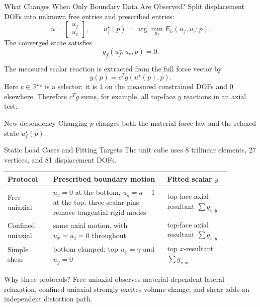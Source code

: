 \documentclass[aspectratio=169,10pt]{beamer}
\begin{document}
\begin{frame}{What Changes When Only Boundary Data Are Observed?}
  \small
  Split displacement DOFs into unknown free entries and prescribed entries:
  \[
    u=\begin{bmatrix}u_f\\u_c\end{bmatrix},
    \qquad
    u_f^\star(p)=\arg\min_{u_f}E_h(u_f,u_c;p).
  \]
  The converged state satisfies
  \[
    \boxed{g_f(u_f^\star,u_c,p)=0}.
  \]

  The measured scalar reaction is extracted from the full force vector by
  \[
    \boxed{y(p)=c^Tg(u^\star(p),p)}.
  \]
  Here $c\in\mathbb R^{n_u}$ is a selector: it is $1$ on the measured
  constrained DOFs and $0$ elsewhere. Therefore $c^Tg$ sums, for example,
  all top-face $y$ reactions in an axial test.

  \begin{alertblock}{New dependency}
    Changing $p$ changes both the material force law and the relaxed state
    $u_f^\star(p)$.
  \end{alertblock}
\end{frame}

\begin{frame}{Static Load Cases and Fitting Targets}
  \scriptsize
  The unit cube uses 8 trilinear elements, 27 vertices, and 81 displacement
  DOFs.

  \begin{table}
    \centering
    \renewcommand{\arraystretch}{1.35}
    \begin{tabular}{p{0.18\linewidth}p{0.45\linewidth}p{0.25\linewidth}}
      \toprule
      Protocol & Prescribed boundary motion & Fitted scalar $y$ \\
      \midrule
      Free uniaxial &
        $u_y=0$ at the bottom, $u_y=a-1$ at the top; three scalar pins remove
        tangential rigid modes &
        top-face axial resultant $\sum g_{v,y}$ \\
      Confined uniaxial &
        same axial motion, with $u_x=u_z=0$ throughout &
        top-face axial resultant $\sum g_{v,y}$ \\
      Simple shear &
        bottom clamped; top $u_x=\gamma$ and $u_y=0$ &
        top $x$-resultant $\sum g_{v,x}$ \\
      \bottomrule
    \end{tabular}
  \end{table}

  \begin{block}{Why three protocols?}
    Free uniaxial observes material-dependent lateral relaxation, confined
    uniaxial strongly excites volume change, and shear adds an independent
    distortion path.
  \end{block}
\end{frame}
\end{document}

